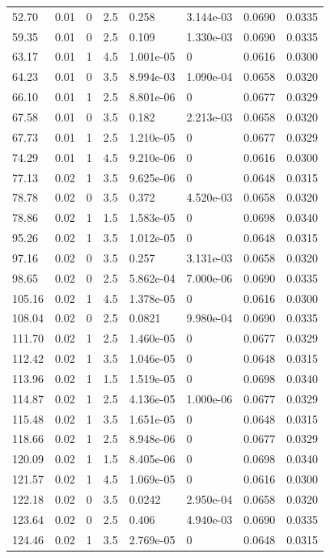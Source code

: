 \documentclass[preview]{standalone}
\begin{document}
{{\begin{tabular}{L{1.2cm}C{1.2cm} C{0.3cm}C{0.5cm} C{1.4cm}C{1.4cm} C{1.4cm}C{1.4cm}}
  52.70  &  0.01  & 0     & 2.5 &  0.258  & 3.144e-03  & 0.0690 &  0.0335   \\ 
  59.35  &  0.01  & 0     & 2.5 &  0.109  & 1.330e-03  & 0.0690 &  0.0335   \\ 
  63.17  &  0.01  & 1     & 4.5 &  1.001e-05  & 0  & 0.0616 &  0.0300   \\ 
  64.23  &  0.01  & 0     & 3.5 &  8.994e-03  & 1.090e-04  & 0.0658 &  0.0320   \\ 
  66.10  &  0.01  & 1     & 2.5 &  8.801e-06  & 0  & 0.0677 &  0.0329   \\ 
  67.58  &  0.01  & 0     & 3.5 &  0.182  & 2.213e-03  & 0.0658 &  0.0320   \\ 
  67.73  &  0.01  & 1     & 2.5 &  1.210e-05  & 0  & 0.0677 &  0.0329   \\ 
  74.29  &  0.01  & 1     & 4.5 &  9.210e-06  & 0  & 0.0616 &  0.0300   \\ 
  77.13  &  0.02  & 1     & 3.5 &  9.625e-06  & 0  & 0.0648 &  0.0315   \\ 
  78.78  &  0.02  & 0     & 3.5 &  0.372  & 4.520e-03  & 0.0658 &  0.0320   \\ 
  78.86  &  0.02  & 1     & 1.5 &  1.583e-05  & 0  & 0.0698 &  0.0340   \\ 
  95.26  &  0.02  & 1     & 3.5 &  1.012e-05  & 0  & 0.0648 &  0.0315   \\ 
  97.16  &  0.02  & 0     & 3.5 &  0.257  & 3.131e-03  & 0.0658 &  0.0320   \\ 
  98.65  &  0.02  & 0     & 2.5 &  5.862e-04  & 7.000e-06  & 0.0690 &  0.0335   \\ 
  105.16  &  0.02  & 1     & 4.5 &  1.378e-05  & 0  & 0.0616 &  0.0300   \\ 
  108.04  &  0.02  & 0     & 2.5 &  0.0821  & 9.980e-04  & 0.0690 &  0.0335   \\ 
  111.70  &  0.02  & 1     & 2.5 &  1.460e-05  & 0  & 0.0677 &  0.0329   \\ 
  112.42  &  0.02  & 1     & 3.5 &  1.046e-05  & 0  & 0.0648 &  0.0315   \\ 
  113.96  &  0.02  & 1     & 1.5 &  1.519e-05  & 0  & 0.0698 &  0.0340   \\ 
  114.87  &  0.02  & 1     & 2.5 &  4.136e-05  & 1.000e-06  & 0.0677 &  0.0329   \\ 
  115.48  &  0.02  & 1     & 3.5 &  1.651e-05  & 0  & 0.0648 &  0.0315   \\ 
  118.66  &  0.02  & 1     & 2.5 &  8.948e-06  & 0  & 0.0677 &  0.0329   \\ 
  120.09  &  0.02  & 1     & 1.5 &  8.405e-06  & 0  & 0.0698 &  0.0340   \\ 
  121.57  &  0.02  & 1     & 4.5 &  1.069e-05  & 0  & 0.0616 &  0.0300   \\ 
  122.18  &  0.02  & 0     & 3.5 &  0.0242  & 2.950e-04  & 0.0658 &  0.0320   \\ 
  123.64  &  0.02  & 0     & 2.5 &  0.406  & 4.940e-03  & 0.0690 &  0.0335   \\ 
  124.46  &  0.02  & 1     & 3.5 &  2.769e-05  & 0  & 0.0648 &  0.0315   \\ 
\hline 
\end{tabular} 

}}
\end{document}
